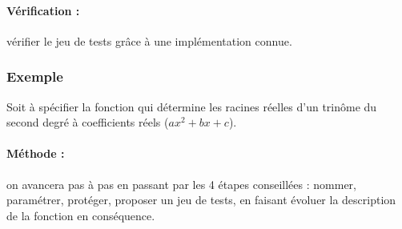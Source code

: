\paragraph{Vérification :} vérifier le jeu de tests gr\^ace à une implémentation connue.

\subsubsection{Exemple}
Soit à spécifier la fonction qui détermine les racines réelles d'un trinôme du 
second degré à coefficients réels ($ax^2 + bx + c$).

\paragraph{Méthode :} on avancera pas à pas en passant par les 4 étapes conseillées :
nommer, paramétrer, protéger, proposer un jeu de tests,
en faisant évoluer la description de la fonction en conséquence.

